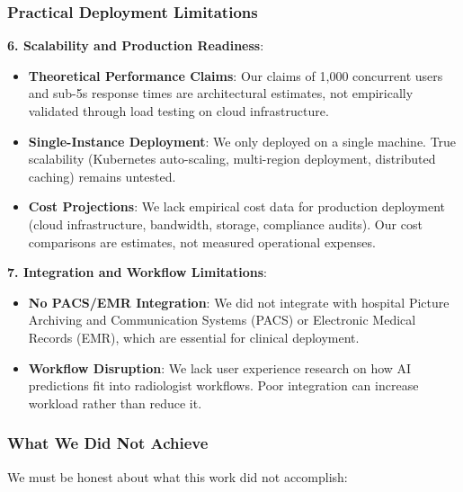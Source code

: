 \documentclass[12pt,a4paper]{article}
\begin{document}
\subsubsection{Practical Deployment Limitations}

\textbf{6. Scalability and Production Readiness}:

\begin{itemize}
    \item \textbf{Theoretical Performance Claims}: Our claims of 1,000 concurrent users and sub-5s response times are architectural estimates, not empirically validated through load testing on cloud infrastructure.
    
    \item \textbf{Single-Instance Deployment}: We only deployed on a single machine. True scalability (Kubernetes auto-scaling, multi-region deployment, distributed caching) remains untested.
    
    \item \textbf{Cost Projections}: We lack empirical cost data for production deployment (cloud infrastructure, bandwidth, storage, compliance audits). Our cost comparisons are estimates, not measured operational expenses.
\end{itemize}

\textbf{7. Integration and Workflow Limitations}:

\begin{itemize}
    \item \textbf{No PACS/EMR Integration}: We did not integrate with hospital Picture Archiving and Communication Systems (PACS) or Electronic Medical Records (EMR), which are essential for clinical deployment.
    
    \item \textbf{Workflow Disruption}: We lack user experience research on how AI predictions fit into radiologist workflows. Poor integration can increase workload rather than reduce it.
\end{itemize}

\subsubsection{What We Did Not Achieve}

We must be honest about what this work did not accomplish:
\end{document}
